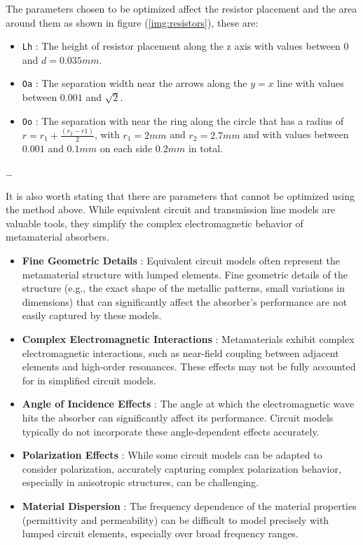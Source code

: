         The parameters chosen to be optimized affect the resistor placement and the area around 
        them as shown in figure (\ref{img:resistors}), these are:
        \begin{itemize}
            \item \texttt{Lh} : The height of resistor placement along the \textsf{z} axis
                with values between 0 and $d=0.035mm$.
            \item \texttt{Oa} : The separation width near the arrows along the $y=x$ line
                with values between $0.001$ and $\sqrt{2}$.
            \item \texttt{Oo} : The separation with near the ring along the circle that has a 
                radius of $r=r_1+\frac{(r_2-r1)}{2}$, with $r_1=2mm$ and $r_2=2.7mm$ and with 
                values between $0.001$ and $0.1mm$ on each side $0.2mm$ in total.
        \end{itemize}
        
        \dots
        
        It is also worth stating that there are parameters that cannot be optimized using the
        method above. While equivalent circuit and transmission line models are valuable tools, 
        they simplify the complex electromagnetic behavior of metamaterial absorbers. 

        \begin{itemize}
            \item \textbf{Fine Geometric Details} : Equivalent circuit models often represent the 
                metamaterial structure with lumped elements. Fine geometric details of the 
                structure (e.g., the exact shape of the metallic patterns, small variations in
                dimensions) that can significantly affect the absorber's performance are not 
                easily captured by these models.
            \item \textbf{Complex Electromagnetic Interactions} : Metamaterials exhibit complex
                electromagnetic interactions, such as near-field coupling between adjacent 
                elements and high-order resonances. These effects may not be fully accounted for 
                in simplified circuit models.
            \item \textbf{Angle of Incidence Effects} : The angle at which the electromagnetic 
                wave hits the absorber can significantly affect its performance. Circuit models
                typically do not incorporate these angle-dependent effects accurately.
            \item \textbf{Polarization Effects} : While some circuit models can be adapted to 
                consider polarization, accurately capturing complex polarization behavior, 
                especially in anisotropic structures, can be challenging.
            \item \textbf{Material Dispersion} : The frequency dependence of the material 
                properties (permittivity and permeability) can be difficult to model precisely 
                with lumped circuit elements, especially over broad frequency ranges.
        \end{itemize}

